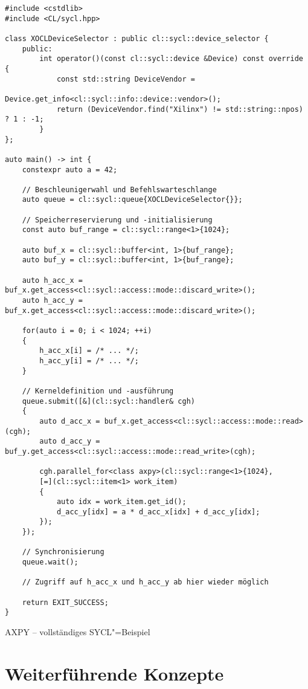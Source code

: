\begin{code}
    \begin{verbatim}
#include <cstdlib>
#include <CL/sycl.hpp>

class XOCLDeviceSelector : public cl::sycl::device_selector {
    public:
        int operator()(const cl::sycl::device &Device) const override {
            const std::string DeviceVendor =
                            Device.get_info<cl::sycl::info::device::vendor>();
            return (DeviceVendor.find("Xilinx") != std::string::npos) ? 1 : -1;
        }
};

auto main() -> int {
    constexpr auto a = 42;

    // Beschleunigerwahl und Befehlswarteschlange
    auto queue = cl::sycl::queue{XOCLDeviceSelector{}};

    // Speicherreservierung und -initialisierung
    const auto buf_range = cl::sycl::range<1>{1024};

    auto buf_x = cl::sycl::buffer<int, 1>{buf_range};
    auto buf_y = cl::sycl::buffer<int, 1>{buf_range};

    auto h_acc_x = buf_x.get_access<cl::sycl::access::mode::discard_write>();
    auto h_acc_y = buf_x.get_access<cl::sycl::access::mode::discard_write>();

    for(auto i = 0; i < 1024; ++i)
    {
        h_acc_x[i] = /* ... */;
        h_acc_y[i] = /* ... */;
    }

    // Kerneldefinition und -ausführung
    queue.submit([&](cl::sycl::handler& cgh)
    {
        auto d_acc_x = buf_x.get_access<cl::sycl::access::mode::read>(cgh);
        auto d_acc_y = buf_y.get_access<cl::sycl::access::mode::read_write>(cgh);

        cgh.parallel_for<class axpy>(cl::sycl::range<1>{1024},
        [=](cl::sycl::item<1> work_item)
        {
            auto idx = work_item.get_id();
            d_acc_y[idx] = a * d_acc_x[idx] + d_acc_y[idx];
        });
    });

    // Synchronisierung
    queue.wait();

    // Zugriff auf h_acc_x und h_acc_y ab hier wieder möglich

    return EXIT_SUCCESS;
}
    \end{verbatim}
    \caption{AXPY -- vollständiges SYCL"=Beispiel}
    \label{sycl:ueberblick:axpy:zusammenfassung:code}
\end{code}

\section{Weiterführende Konzepte}\label{sycl:konzepte}

